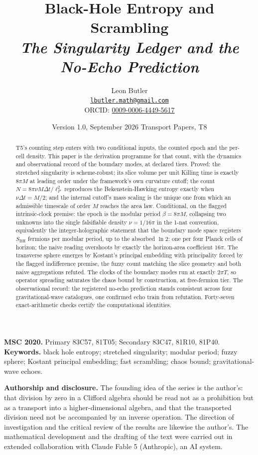\documentclass[11pt]{article}
\title{\bfseries Black-Hole Entropy and Scrambling\\[4pt]
  \large\itshape The Singularity Ledger and the No-Echo Prediction}
\author{Leon Butler\\ \normalsize\href{mailto:lbutler.math@gmail.com}{\texttt{lbutler.math@gmail.com}}\\ \normalsize ORCID: \href{https://orcid.org/0009-0006-4449-5617}{0009-0006-4449-5617}}
\date{Version 1.0, September 2026 \textperiodcentered{} Transport Papers, T8}
\theoremstyle{definition}
\newcommand{\lP}{\ell_{P}}
\newcommand{\SBH}{S_{\mathrm{BH}}}
\begin{document}
\maketitle

\begin{abstract}
\normalsize
T5's counting step enters with two conditional inputs, the counted epoch and the per-cell density. This paper is the derivation programme for that count, with the dynamics and observational record of the boundary modes, at declared tiers. Proved: the stretched singularity is scheme-robust; its slice volume per unit Killing time is exactly $8\pi M$ at leading order under the framework's own curvature cutoff; the count $N = 8\pi\nu M\Delta t/\lP^2$ reproduces the Bekenstein-Hawking entropy exactly when $\nu\Delta t = M/2$; and the internal cutoff's mass scaling is the unique one from which an admissible timescale of order $M$ reaches the area law. Conditional, on the flagged intrinsic-clock premise: the epoch is the modular period $\beta = 8\pi M$, collapsing two unknowns into the single falsifiable density $\nu = 1/16\pi$ in the 1-nat convention, equivalently the integer-holographic statement that the boundary mode space registers $\SBH$ fermions per modular period, up to the absorbed $\ln 2$: one per four Planck cells of horizon; the naive reading overshoots by exactly the horizon-area coefficient $16\pi$. The transverse sphere emerges by Kostant's principal embedding with principality forced by the flagged indifference premise, the fuzzy count matching the slice geometry and both naive aggregations refuted. The clocks of the boundary modes run at exactly $2\pi T$, so operator spreading saturates the chaos bound by construction, at free-fermion tier. The observational record: the registered no-echo prediction stands consistent across four gravitational-wave catalogues, one confirmed echo train from refutation. Forty-seven exact-arithmetic checks certify the computational identities.
\end{abstract}

\medskip
\noindent\textbf{MSC 2020.} Primary 83C57, 81T05; Secondary 83C47, 81R10, 81P40.\\
\textbf{Keywords.} black hole entropy; stretched singularity; modular period; fuzzy sphere; Kostant principal embedding; fast scrambling; chaos bound; gravitational-wave echoes.

\newpage
\textbf{Authorship and disclosure. }The founding idea of the series is the author's: that division by zero in a Clifford algebra should be read not as a prohibition but as a transport into a higher-dimensional algebra, and that the transported division need not be accompanied by an inverse operation. The direction of investigation and the critical review of the results are likewise the author's. The mathematical development and the drafting of the text were carried out in extended collaboration with Claude Fable 5 (Anthropic), an AI system.
\end{document}
